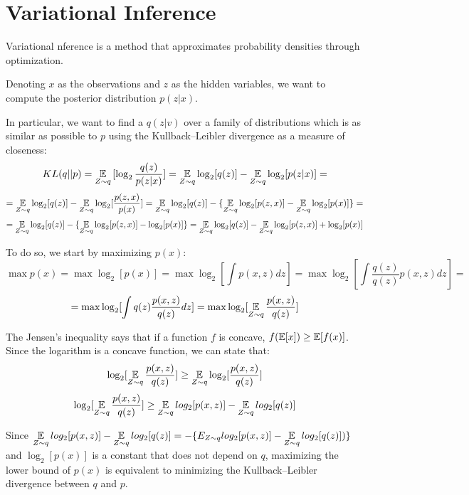 \chapter{Variational Inference} \label{vi}
Variational nference is a method that approximates probability densities through optimization.

Denoting $x$ as the observations and $z$ as the hidden variables,
we want to compute the posterior distribution $p(z | x)$.

In particular, we want to find a $q(z | v)$ over a family of distributions which is as similar
as possible to $p$ using the Kullback–Leibler divergence as a measure of closeness:
$$ KL(q || p) = \operatorname*{\mathbb{E}}_{Z \sim q} {[\log_2 \frac{q(z)}{p(z | x)}]} = \operatorname*{\mathbb{E}}_{Z \sim q} \log_2 [q(z)] - \operatorname*{\mathbb{E}}_{Z \sim q} \log_2 [p(z | x)] = $$
$$ = \operatorname*{\mathbb{E}}_{Z \sim q} \log_2 [q(z)] - \operatorname*{\mathbb{E}}_{Z \sim q} \log_2 [\frac{p(z,x)}{p(x)}] = \operatorname*{\mathbb{E}}_{Z \sim q} \log_2 [q(z)] - \{ \operatorname*{\mathbb{E}}_{Z \sim q} \log_2 [p(z,x)] - \operatorname*{\mathbb{E}}_{Z \sim q} \log_2 [p(x)] \} = $$
$$ = \operatorname*{\mathbb{E}}_{Z \sim q} \log_2 [q(z)] - \{ \operatorname*{\mathbb{E}}_{Z \sim q} \log_2 [p(z,x)] - \log_2 [p(x)] \} = \operatorname*{\mathbb{E}}_{Z \sim q} \log_2 [q(z)] - \operatorname*{\mathbb{E}}_{Z \sim q} \log_2 [p(z,x)] + \log_2 [p(x)] $$


To do so, we start by maximizing $p(x)$:
$$
    \displaystyle \max p(x) = \max \log_2[p(x)]
    = \max \log_2[\int p(x,z) dz]
    = \max \log_2[\int \frac{q(z)}{q(z)} p(x,z) dz] =
$$
$$
    = \max \log_2[\int q(z) \frac{p(x,z)}{q(z)} dz]
    = \max \log_2[\operatorname*{\mathbb{E}}_{Z \sim q} \frac{p(x,z)}{q(z)}]
$$

The Jensen's inequality says that if a function $f$ is concave, $f(\operatorname*{\mathbb{E}}[x]) \geq \operatorname*{\mathbb{E}}[f(x)]$.
Since the logarithm is a concave function, we can state that:
$$ \log_2[\operatorname*{\mathbb{E}}_{Z \sim q} \frac{p(x,z)}{q(z)}] \geq \operatorname*{\mathbb{E}}_{Z \sim q} \log_2[\frac{p(x,z)}{q(z)}] $$
$$ \log_2[\operatorname*{\mathbb{E}}_{Z \sim q} \frac{p(x,z)}{q(z)}] \geq \operatorname*{\mathbb{E}}_{Z \sim q} log_2[p(x,z)] - \operatorname*{\mathbb{E}}_{Z \sim q} log_2[q(z)] $$

Since $ \displaystyle \operatorname*{\mathbb{E}}_{Z \sim q} log_2[p(x,z)] - \operatorname*{\mathbb{E}}_{Z \sim q} log_2[q(z)] = -\{E_{Z \sim q} log_2[p(x,z)] - \operatorname*{\mathbb{E}}_{Z \sim q} log_2[q(z)])\}$
and $\log_2[p(x)]$ is a constant that does not depend on $q$,
maximizing the lower bound of $p(x)$ is equivalent to minimizing the Kullback–Leibler divergence between $q$ and $p$.

